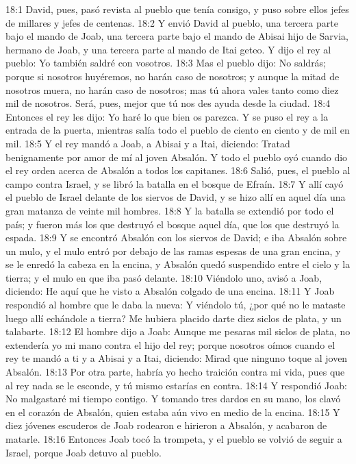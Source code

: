 18:1 David, pues, pasó revista al pueblo que tenía consigo, y puso sobre ellos jefes de millares y jefes de centenas.  
18:2 Y envió David al pueblo, una tercera parte bajo el mando de Joab, una tercera parte bajo el mando de Abisai hijo de Sarvia, hermano de Joab, y una tercera parte al mando de Itai geteo. Y dijo el rey al pueblo: Yo también saldré con vosotros.  
18:3 Mas el pueblo dijo: No saldrás; porque si nosotros huyéremos, no harán caso de nosotros; y aunque la mitad de nosotros muera, no harán caso de nosotros; mas tú ahora vales tanto como diez mil de nosotros. Será, pues, mejor que tú nos des ayuda desde la ciudad.  
18:4 Entonces el rey les dijo: Yo haré lo que bien os parezca. Y se puso el rey a la entrada de la puerta, mientras salía todo el pueblo de ciento en ciento y de mil en mil.  
18:5 Y el rey mandó a Joab, a Abisai y a Itai, diciendo: Tratad benignamente por amor de mí al joven Absalón. Y todo el pueblo oyó cuando dio el rey orden acerca de Absalón a todos los capitanes.  
18:6 Salió, pues, el pueblo al campo contra Israel, y se libró la batalla en el bosque de Efraín.  
18:7 Y allí cayó el pueblo de Israel delante de los siervos de David, y se hizo allí en aquel día una gran matanza de veinte mil hombres.  
18:8 Y la batalla se extendió por todo el país; y fueron más los que destruyó el bosque aquel día, que los que destruyó la espada.  
18:9 Y se encontró Absalón con los siervos de David; e iba Absalón sobre un mulo, y el mulo entró por debajo de las ramas espesas de una gran encina, y se le enredó la cabeza en la encina, y Absalón quedó suspendido entre el cielo y la tierra; y el mulo en que iba pasó delante.  
18:10 Viéndolo uno, avisó a Joab, diciendo: He aquí que he visto a Absalón colgado de una encina.  
18:11 Y Joab respondió al hombre que le daba la nueva: Y viéndolo tú, ¿por qué no le mataste luego allí echándole a tierra? Me hubiera placido darte diez siclos de plata,  y un talabarte.  
18:12 El hombre dijo a Joab: Aunque me pesaras mil siclos de plata,  no extendería yo mi mano contra el hijo del rey; porque nosotros oímos cuando el rey te mandó a ti y a Abisai y a Itai, diciendo: Mirad que ninguno toque al joven Absalón.  
18:13 Por otra parte, habría yo hecho traición contra mi vida, pues que al rey nada se le esconde, y tú mismo estarías en contra. 
18:14 Y respondió Joab: No malgastaré mi tiempo contigo. Y tomando tres dardos en su mano, los clavó en el corazón de Absalón, quien estaba aún vivo en medio de la encina.  
18:15 Y diez jóvenes escuderos de Joab rodearon e hirieron a Absalón, y acabaron de matarle.  
18:16 Entonces Joab tocó la trompeta, y el pueblo se volvió de seguir a Israel, porque Joab detuvo al pueblo.  
